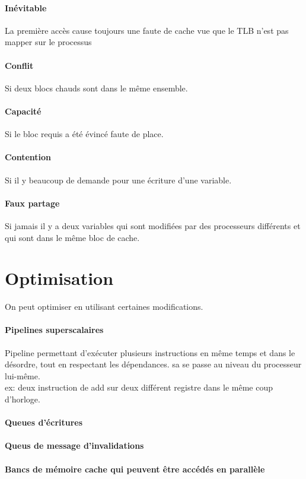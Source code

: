 \documentclass[oneside]{book}
\begin{document}
\paragraph{Inévitable} La première accès cause toujours une faute de cache vue que le TLB n'est pas mapper sur le processus
\paragraph{Conflit} Si deux blocs chauds sont dans le même ensemble.
\paragraph{Capacité} Si le bloc requis a été évincé faute de place.
\paragraph{Contention} Si il y beaucoup de demande pour une écriture d'une variable.
\paragraph{Faux partage} Si jamais il y a deux variables qui sont modifiées par des processeurs différents et qui sont dans le même bloc de cache.

\section{Optimisation}
On peut optimiser en utilisant certaines modifications.

\paragraph{Pipelines superscalaires} Pipeline permettant d'exécuter plusieurs instructions en même temps et dans le désordre, tout en respectant les dépendances. sa se passe au niveau du processeur lui-même.\\

ex: deux instruction de add sur deux différent registre dans le même coup d'horloge.\\
\paragraph{Queues d'écritures}
\paragraph{Queus de message d'invalidations}
\paragraph{Bancs de mémoire cache qui peuvent être accédés en parallèle}
\end{document}
